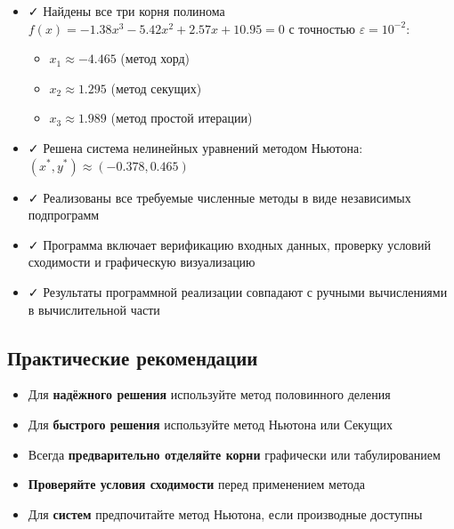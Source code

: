 \documentclass[a4paper,12pt]{article}
\begin{document}
\begin{itemize}
    \item ✓ Найдены все три корня полинома $f(x) = -1.38x^3 - 5.42x^2 + 2.57x + 10.95 = 0$ с точностью $\varepsilon = 10^{-2}$:
    \begin{itemize}
        \item $x_1 \approx -4.465$ (метод хорд)
        \item $x_2 \approx 1.295$ (метод секущих)
        \item $x_3 \approx 1.989$ (метод простой итерации)
    \end{itemize}
    
    \item ✓ Решена система нелинейных уравнений методом Ньютона:
    $(x^*, y^*) \approx (-0.378, 0.465)$
    
    \item ✓ Реализованы все требуемые численные методы в виде независимых подпрограмм
    
    \item ✓ Программа включает верификацию входных данных, проверку условий сходимости и графическую визуализацию
    
    \item ✓ Результаты программной реализации совпадают с ручными вычислениями в вычислительной части
\end{itemize}

\subsection{Практические рекомендации}

\begin{itemize}
    \item Для \textbf{надёжного решения} используйте метод половинного деления
    \item Для \textbf{быстрого решения} используйте метод Ньютона или Секущих
    \item Всегда \textbf{предварительно отделяйте корни} графически или табулированием
    \item \textbf{Проверяйте условия сходимости} перед применением метода
    \item Для \textbf{систем} предпочитайте метод Ньютона, если производные доступны
\end{itemize}
\end{document}
